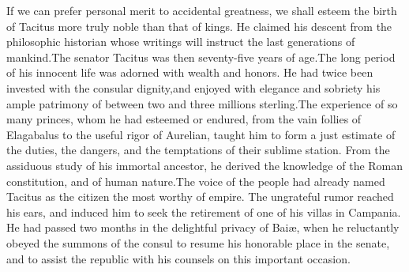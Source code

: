 
If we can prefer personal merit to accidental greatness, we shall
esteem the birth of Tacitus more truly noble than that of kings.
He claimed his descent from the philosophic historian whose
writings will instruct the last generations of mankind.\footnotemark[5] The
senator Tacitus was then seventy-five years of age.\footnotemark[6] The long
period of his innocent life was adorned with wealth and honors.
He had twice been invested with the consular dignity,\footnotemark[7] and
enjoyed with elegance and sobriety his ample patrimony of between
two and three millions sterling.\footnotemark[8] The experience of so many
princes, whom he had esteemed or endured, from the vain follies
of Elagabalus to the useful rigor of Aurelian, taught him to form
a just estimate of the duties, the dangers, and the temptations
of their sublime station. From the assiduous study of his
immortal ancestor, he derived the knowledge of the Roman
constitution, and of human nature.\footnotemark[9] The voice of the people had
already named Tacitus as the citizen the most worthy of empire.
The ungrateful rumor reached his ears, and induced him to seek
the retirement of one of his villas in Campania. He had passed
two months in the delightful privacy of Baiæ, when he reluctantly
obeyed the summons of the consul to resume his honorable place in
the senate, and to assist the republic with his counsels on this
important occasion.





